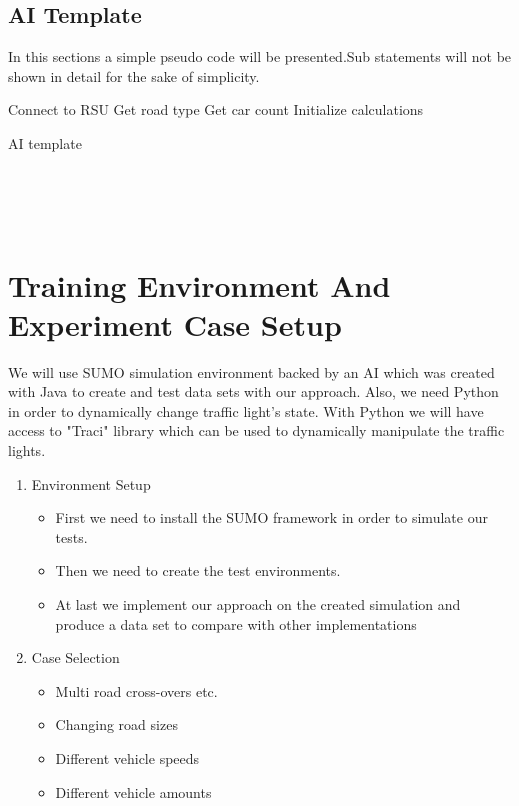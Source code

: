 \documentclass[conference]{IEEEtran}
\begin{document}
\subsection{AI Template}
In this sections a simple pseudo code will be presented.Sub statements will not be shown in detail for the sake of simplicity.
\begin{algorithm}
\SetAlgoLined

Connect to RSU\;
Get road type\;
Get car count\;
Initialize calculations\;\

 \caption{AI template }
\end{algorithm}
\\
\\
\\

\section{Training Environment And Experiment Case Setup}
We will use SUMO simulation environment backed by an AI which was created with Java to 
create and test data sets with our approach. Also, we need Python in order to dynamically change traffic light's state. With Python we will have access to "Traci" library which can be used to dynamically manipulate the traffic lights. 
\begin{enumerate}
	\item Environment Setup
	      \begin{itemize}
	      	\item First we need to install the SUMO framework in order to simulate our tests.
	      	\item Then we need to create the test environments.
	      	\item At last we implement our approach on the created simulation and produce a data set to compare with other implementations
	      \end{itemize}
	\item Case Selection
	      \begin{itemize}
	      	\item Multi road cross-overs etc.
	      	\item Changing road sizes
	      	\item Different vehicle speeds
	      	\item Different vehicle amounts
	      \end{itemize}
	      
\end{enumerate}
\end{document}
